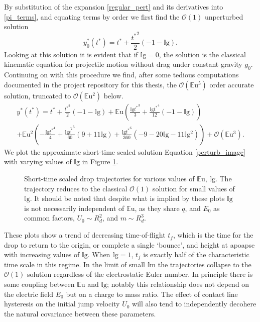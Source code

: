 \documentclass[12pt,a4paper,oneside]{book}
\begin{document}
By substitution of the expansion  \ref{regular_pert} and its derivatives into \ref{pi_terms}, and equating terms by order we first find the $\mathcal{O}(1)$ unperturbed solution
\[{y^*_{0}}{\left ({t^*} \right )} = {t^*} + \frac{{t^*}^{2}}{2} \left(-1 - \mathbb{I}\mbox{g}\right). \]
Looking at this solution it is evident that if $\mathbb{I}\mbox{g}=0$, the solution is the classical kinematic equation for projectile motion without drag under constant gravity $g_0$. Continuing on with this procedure we find, after some tedious computations documented in the project repository for this thesis\cite{schmidt_droplet_electro-bounce:_2017}, the $\mathcal{O}(\mathbb{E}\mbox{u}^5)$ order accurate solution, truncated to $\mathcal{O}(\mathbb{E}\mbox{u}^2)$ below.
\begin{eqnarray}
\label{perturb_image}
&{y^*}({t^*}) = {t^*} + \frac{{t^*}^{2}}{2} \left(-1 - \mathbb{I}\mbox{g}\right) + \mathbb{E}\mbox{u} \left(\frac{\mathbb{I}\mbox{g} {t^*}^{3}}{3} + \frac{\mathbb{I}\mbox{g} {t^*}^{4}}{12} \left(-1 - \mathbb{I}\mbox{g} \right)\right)& \\
&+ \mathbb{E}\mbox{u}^{2} \left(- \frac{\mathbb{I}\mbox{g} {t^*}^{4}}{4} + \frac{\mathbb{I}\mbox{g} \bar{t^*}^{5}}{60} \left(9 + 11 \mathbb{I}\mbox{g} \right) + \frac{\mathbb{I}\mbox{g} {t^*}^{6}}{360} \left(-9 - 20 \mathbb{I}\mbox{g} - 11 \mathbb{I}\mbox{g}^{2}\right)\right) + \mathcal{O}(\mathbb{E}\mbox{u}^3).&\nonumber
\end{eqnarray}
We plot the approximate short-time scaled solution Equation \ref{perturb_image} with varying values of $\mathbb{I}\mbox{g}$ in Figure \ref{fig:short_times}.
\begin{figure}[htb]
    \centering
    \resizebox{1\textwidth}{!}{}
    \caption{Short-time scaled drop trajectories for various values of $\mathbb{E}\mbox{u}$, $\mathbb{I}\mbox{g}$. The trajectory reduces to the classical $\mathcal{O}(1)$ solution for small values of $\mathbb{I}\mbox{g}$. It should be noted that despite what is implied by these plots $\mathbb{I}\mbox{g}$ is not necessarily independent of $\mathbb{E}\mbox{u}$, as they share $q$, and $E_0$ as common factors, $U_0 \sim R_d^2$, and $m \sim R_d^3$.}
    \label{fig:short_times}
\end{figure}
These plots show a trend of decreasing time-of-flight $t_f$, which is the time for the drop to return to the origin, or complete a single `bounce', and height at apoapse with increasing values of $\mathbb{I}\mbox{g}$. When $\mathbb{I}\mbox{g} = 1$, $t_f$ is exactly half of the characteristic time scale in this regime. In the limit of small $\mathbb{I}\mbox{m}$ the trajectories collapse to the $\mathcal{O}(1)$ solution regardless of the electrostatic Euler number. In principle there is some coupling between $\mathbb{E}\mbox{u}$ and $\mathbb{I}\mbox{g}$; notably this relationship does not depend on the electric field $E_0$ but on a charge to mass ratio. The effect of contact line hysteresis on the initial jump velocity $U_0$ will also tend to independently decohere the natural covariance between these parameters.
\end{document}
